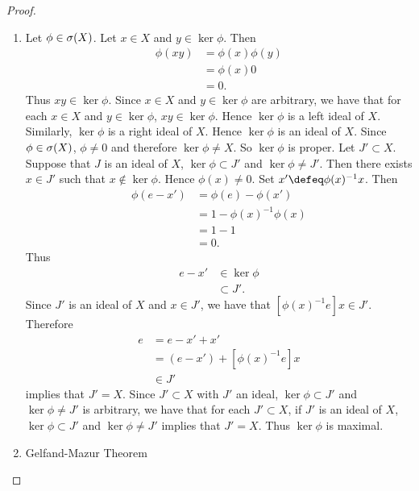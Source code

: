 \documentclass{book}
\begin{document}
	\begin{proof}\
		\begin{enumerate}
			\item Let $\phi \in \sigma(X)$. Let $x \in X$ and $y \in \ker \phi$. Then  
			\begin{align*}
				\phi(xy)
				& = \phi(x) \phi(y) \\
				& = \phi(x) 0 \\
				& = 0.
			\end{align*}
			Thus $xy \in \ker \phi$. Since $x \in X$ and $y \in \ker \phi$ are arbitrary, we have that for each $x \in X$ and $y \in \ker \phi$, $xy \in \ker \phi$. Hence $\ker \phi$ is a left ideal of $X$. Similarly,  $\ker \phi$ is a right ideal of $X$. Hence $\ker \phi$ is an ideal of $X$. Since $\phi \in \sigma(X)$, $\phi \neq 0$ and therefore $\ker \phi \neq X$. So $\ker \phi$ is proper. Let $J' \subset X$. Suppose that $J$ is an ideal of $X$, $\ker \phi \subset J'$ and $\ker \phi \neq J'$. Then there exists $x \in J'$ such that $x \not \in \ker \phi$. Hence $\phi(x) \neq 0$. Set $x' \defeq \phi(x)^{-1} x$. Then 
			\begin{align*}
				\phi(e - x')
				& = \phi(e) - \phi(x') \\
				& = 1 - \phi(x)^{-1}\phi(x) \\
				& = 1 - 1 \\
				& = 0.
			\end{align*}
			Thus  
			\begin{align*}
				e - x' 
				& \in \ker \phi \\
				& \subset J'.
			\end{align*}
			Since $J'$ is an ideal of $X$ and $x \in J'$, we have that $[\phi(x)^{-1}e] x \in J'$. Therefore 
			\begin{align*}
				e
				& = e - x' + x' \\
				& = (e - x') + [\phi(x)^{-1}e] x \\
				& \in J'
			\end{align*}
			 implies that $J' = X$. Since $J' \subset X$ with $J'$ an ideal, $\ker \phi \subset J'$ and $\ker \phi \neq J'$ is arbitrary, we have that for each $J' \subset X$, if $J'$ is an ideal of $X$, $\ker \phi \subset J'$ and $\ker \phi \neq J'$ implies that $J' = X$. Thus $\ker \phi$ is maximal. 
			\item Gelfand-Mazur Theorem
		\end{enumerate}
	\end{proof}

	
	
\end{document}
